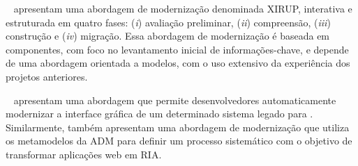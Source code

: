 

~ apresentam uma abordagem de modernização denominada XIRUP, interativa e estruturada em quatro fases: (\textit{i}) avaliação preliminar,
(\textit{ii}) compreensão, (\textit{iii}) construção e (\textit{iv}) migração. Essa abordagem de modernização é baseada em componentes, com foco no levantamento inicial de informações-chave, e depende de uma abordagem orientada a modelos, com o uso extensivo da experiência dos projetos anteriores. 

~ apresentam uma abordagem que permite desenvolvedores automaticamente modernizar a interface gráfica de um determinado sistema legado para .
%
%
%
 Similarmente,  também apresentam uma abordagem de modernização que utiliza os metamodelos da ADM para definir um processo sistemático com o objetivo de transformar aplicações web em RIA.
 
 
